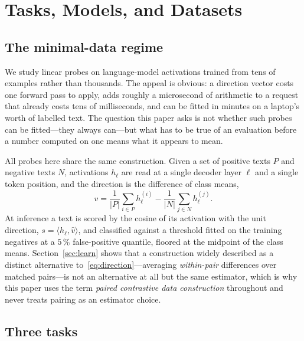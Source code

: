 \section{Tasks, Models, and Datasets}
\label{sec:setup}

\subsection{The minimal-data regime}
\label{sec:regime}

We study linear probes on language-model activations trained from tens of examples rather than thousands. The appeal
is obvious: a direction vector costs one forward pass to apply, adds roughly a microsecond of arithmetic to a request
that already costs tens of milliseconds, and can be fitted in minutes on a laptop's worth of labelled text. The
question this paper asks is not whether such probes can be fitted---they always can---but what has to be true of an
evaluation before a number computed on one means what it appears to mean.

All probes here share the same construction. Given a set of positive texts $P$ and negative texts $N$, activations
$h_\ell$ are read at a single decoder layer $\ell$ and a single token position, and the direction is the difference of
class means,
\begin{equation}
    v = \frac{1}{|P|}\sum_{i \in P} h^{(i)}_\ell - \frac{1}{|N|}\sum_{j \in N} h^{(j)}_\ell .
    \label{eq:direction}
\end{equation}
At inference a text is scored by the cosine of its activation with the unit direction, $s = \langle \hat{h}_\ell,
\hat{v}\rangle$, and classified against a threshold fitted on the training negatives at a $5\,\%$ false-positive
quantile, floored at the midpoint of the class means. Section~\ref{sec:learn} shows that a construction widely
described as a distinct alternative to~\eqref{eq:direction}---averaging \emph{within-pair} differences over matched
pairs---is not an alternative at all but the same estimator, which is why this paper uses the term \emph{paired
contrastive data construction} throughout and never treats pairing as an estimator choice.

\subsection{Three tasks}
\label{sec:tasks}

